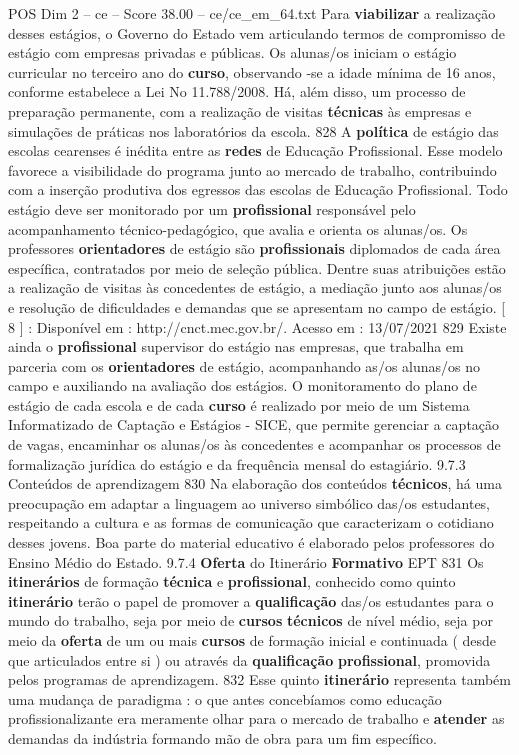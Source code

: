 \begin{textsample}{POS Dim 2 – ce – Score 38.00 – ce/ce\_em\_64.txt}
Para \textbf{viabilizar} a realização desses estágios, o Governo do Estado vem articulando termos de compromisso de estágio com empresas privadas e públicas.
Os alunas/os iniciam o estágio curricular no terceiro ano do \textbf{curso}, observando -se a idade mínima de 16 anos, conforme estabelece a Lei No 11.788/2008.
Há, além disso, um processo de preparação permanente, com a realização de visitas \textbf{técnicas} às empresas e simulações de práticas nos laboratórios da escola. 828 A \textbf{política} de estágio das escolas cearenses é inédita entre as \textbf{redes} de Educação Profissional.
Esse modelo favorece a visibilidade do programa junto ao mercado de trabalho, contribuindo com a inserção produtiva dos egressos das escolas de Educação Profissional.
Todo estágio deve ser monitorado por um \textbf{profissional} responsável pelo acompanhamento técnico-pedagógico, que avalia e orienta os alunas/os.
Os professores \textbf{orientadores} de estágio são \textbf{profissionais} diplomados de cada área específica, contratados por meio de seleção pública.
Dentre suas atribuições estão a realização de visitas às concedentes de estágio, a mediação junto aos alunas/os e resolução de dificuldades e demandas que se apresentam no campo de estágio. [ 8 ] : Disponível em : http://cnct.mec.gov.br/.
Acesso em : 13/07/2021 829 Existe ainda o \textbf{profissional} supervisor do estágio nas empresas, que trabalha em parceria com os \textbf{orientadores} de estágio, acompanhando as/os alunas/os no campo e auxiliando na avaliação dos estágios.
O monitoramento do plano de estágio de cada escola e de cada \textbf{curso} é realizado por meio de um Sistema Informatizado de Captação e Estágios - SICE, que permite gerenciar a captação de vagas, encaminhar os alunas/os às concedentes e acompanhar os processos de formalização jurídica do estágio e da frequência mensal do estagiário. 9.7.3 Conteúdos de aprendizagem 830 Na elaboração dos conteúdos \textbf{técnicos}, há uma preocupação em adaptar a linguagem ao universo simbólico das/os estudantes, respeitando a cultura e as formas de comunicação que caracterizam o cotidiano desses jovens.
Boa parte do material educativo é elaborado pelos professores do Ensino Médio do Estado. 9.7.4 \textbf{Oferta} do Itinerário \textbf{Formativo} EPT 831 Os \textbf{itinerários} de formação \textbf{técnica} e \textbf{profissional}, conhecido como quinto \textbf{itinerário} terão o papel de promover a \textbf{qualificação} das/os estudantes para o mundo do trabalho, seja por meio de \textbf{cursos} \textbf{técnicos} de nível médio, seja por meio da \textbf{oferta} de um ou mais \textbf{cursos} de formação inicial e continuada ( desde que articulados entre si ) ou através da \textbf{qualificação} \textbf{profissional}, promovida pelos programas de aprendizagem. 832 Esse quinto \textbf{itinerário} representa também uma mudança de paradigma : o que antes concebíamos como educação profissionalizante era meramente olhar para o mercado de trabalho e \textbf{atender} as demandas da indústria formando mão de obra para um fim específico.

\end{textsample}
